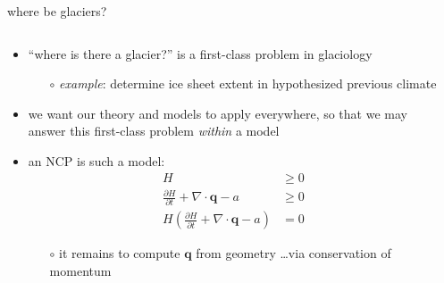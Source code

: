 \documentclass[10pt,hyperref,dvipsnames]{beamer}
\newcommand{\bq}{\mathbf{q}}
\newcommand{\Div}{\nabla\cdot}
\begin{document}
\begin{frame}{where be glaciers?}

\begin{columns}
\begin{column}{0.65\textwidth}
\begin{itemize}
\item ``where is there a glacier?'' is a first-class problem in glaciology
    \begin{itemize}
    \item[$\circ$] \emph{example}: determine ice sheet extent in hypothesized previous climate
    \end{itemize}
\item we want our theory and models to apply everywhere, so that we may answer this first-class problem \emph{within} a model
\item an NCP is such a model:
\begin{align*}
H &\ge 0 \\
\frac{\partial H}{\partial t} + \Div \bq - a &\ge 0 \\
H \left(\frac{\partial H}{\partial t} + \Div \bq - a\right) &= 0
\end{align*}
    \begin{itemize}
    \item[$\circ$] it remains to compute $\bq$ from geometry \dots via conservation of momentum
    \end{itemize}
\end{itemize}
\end{column}
\begin{column}{0.35\textwidth}

\end{column}
\end{columns}
\end{frame}
\end{document}
